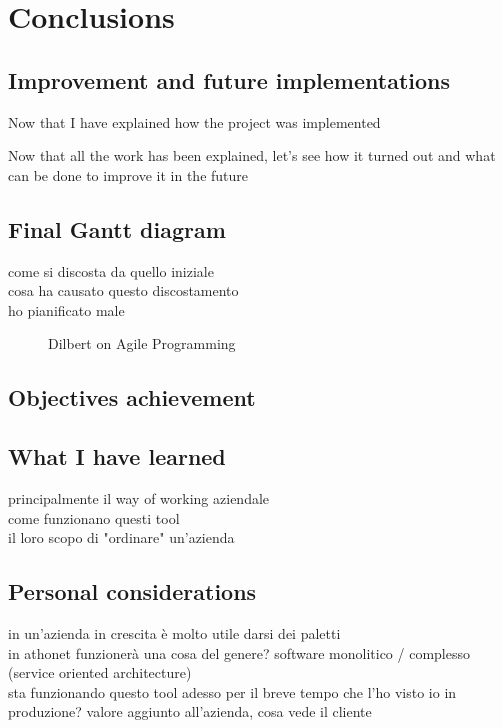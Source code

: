 \chapter{Conclusions}
\label{conclusions}

\section{Improvement and future implementations}

	Now that I have explained how the project was implemented

Now that all the work has been explained, let's see how it turned out and what can be done to improve it in the future

\section{Final Gantt diagram}
	come si discosta da quello iniziale\\
	cosa ha causato questo discostamento\\
	ho pianificato male
	
	\begin{figure}[H]
		\centering
		\caption{Dilbert on Agile Programming}
	\end{figure}
	
\section{Objectives achievement}

\section{What I have learned}
	principalmente il way of working aziendale\\
	come funzionano questi tool\\
	il loro scopo di "ordinare" un'azienda

\section{Personal considerations}
	in un'azienda in crescita è molto utile darsi dei paletti\\
	in athonet funzionerà una cosa del genere?  software monolitico / complesso (service oriented architecture)\\
	sta funzionando questo tool adesso per il breve tempo che l'ho visto io in produzione?
	valore aggiunto all'azienda, cosa vede il cliente